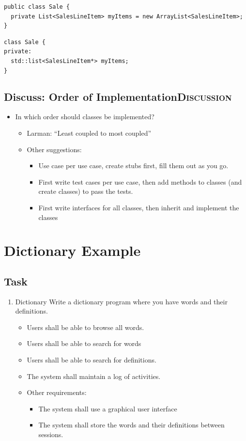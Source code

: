 \documentclass[10pt,t,a4paper]{article}
\begin{document}
\begin{verbatim}
public class Sale {
  private List<SalesLineItem> myItems = new ArrayList<SalesLineItem>;
}
\end{verbatim}

\begin{verbatim}
class Sale {
private:
  std::list<SalesLineItem*> myItems;
}
\end{verbatim}
\subsection{Discuss: Order of Implementation\hfill{}\textsc{Discussion}}
\label{sec:orgheadline4}
\begin{itemize}
\item In which order should classes be implemented?
\begin{itemize}
\item Larman: ``Least coupled to most coupled''
\item Other suggestions:
\begin{itemize}
\item Use case per use case, create stubs first, fill them out as you go.
\item First write test cases per use case, then add methods to classes (and create classes) to pass the tests.
\item First write interfaces for all classes, then inherit and implement the classes
\end{itemize}
\end{itemize}
\end{itemize}
\section{Dictionary Example}
\label{sec:orgheadline15}
\subsection{Task}
\label{sec:orgheadline7}
\begin{enumerate}
\item Dictionary
\label{sec:orgheadline6}
Write a dictionary program where you have words and their definitions.
\begin{itemize}
\item Users shall be able to browse all words.
\item Users shall be able to search for words
\item Users shall be able to search for definitions.
\item The system shall maintain a log of activities.
\item Other requirements:
\begin{itemize}
\item The system shall use a graphical user interface
\item The system shall store the words and their definitions between sessions.
\end{itemize}
\end{itemize}
\end{enumerate}
\end{document}
